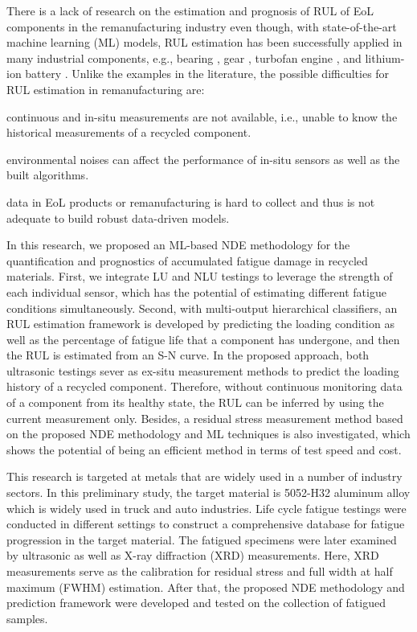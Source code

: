 There is a lack of research on the estimation and prognosis of RUL of EoL components in the remanufacturing industry even though, with state-of-the-art machine learning (ML) models, RUL estimation has been successfully applied in many industrial components, e.g., bearing \cite{rul-nn-bearing-BENALI2015150, rul-cnn-bearing-LI20181, rul-ensemble-bearing}, gear \cite{rul-review-gear}, turbofan engine \cite{rul-statespace-turbo-battery-Mosallam2016,rul-cnn-turbo-LI20181,rul-rnn-turbo-WU2020241}, and lithium-ion battery \cite{rul-statespace-turbo-battery-Mosallam2016,rul-review-battery-LIPU2018115,rul-gpr-battery-9040661}. Unlike the examples in the literature, the possible difficulties for RUL estimation in remanufacturing are: 
\begin{enumerate*}[label=(\alph*)]
    \item continuous and in-situ measurements are not available, i.e., unable to know the historical measurements of a recycled component.
    \item environmental noises can affect the performance of in-situ sensors as well as the built algorithms.
    \item data in EoL products or remanufacturing is hard to collect and thus is not adequate to build robust data-driven models.
\end{enumerate*}

In this research, we proposed an ML-based NDE methodology for the quantification and prognostics of accumulated fatigue damage in recycled materials. First, we integrate LU and NLU testings to leverage the strength of each individual sensor, which has the potential of estimating different fatigue conditions simultaneously. Second, with multi-output hierarchical classifiers, an RUL estimation framework is developed by predicting the loading condition as well as the percentage of fatigue life that a component has undergone, and then the RUL is estimated from an S-N curve. In the proposed approach, both ultrasonic testings sever as ex-situ measurement methods to predict the loading history of a recycled component. Therefore, without continuous monitoring data of a component from its healthy state, the RUL can be inferred by using the current measurement only. Besides, a residual stress measurement method based on the proposed NDE methodology and ML techniques is also investigated, which shows the potential of being an efficient method in terms of test speed and cost.

This research is targeted at metals that are widely used in a number of industry sectors. In this preliminary study, the target material is 5052-H32 aluminum alloy which is widely used in truck and auto industries. Life cycle fatigue testings were conducted in different settings to construct a comprehensive database for fatigue progression in the target material. The fatigued specimens were later examined by ultrasonic as well as X-ray diffraction (XRD) measurements. Here, XRD measurements serve as the calibration for residual stress and full width at half maximum (FWHM) estimation. After that, the proposed NDE methodology and prediction framework were developed and tested on the collection of fatigued samples.

